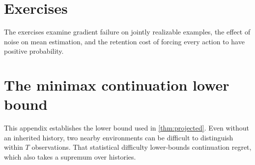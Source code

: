 \documentclass[11pt,twoside]{article}
\theoremstyle{definition}
\theoremstyle{remark}
\begin{document}
\section{Exercises}
\label{sec:exercises}
The exercises examine gradient failure on jointly realizable examples,
the effect of noise on mean estimation, and the retention cost of forcing
every action to have positive probability.
\exerciseinstructions
\setcounter{courseexercise}{0}




\appendix
\section{The minimax continuation lower bound}
\label{app:minimax}

This appendix establishes the lower bound used in
\cref{thm:projected}. Even without an inherited history, two nearby
environments can be difficult to distinguish within $T$ observations.
That statistical difficulty lower-bounds continuation regret, which also
takes a supremum over histories.
\end{document}
